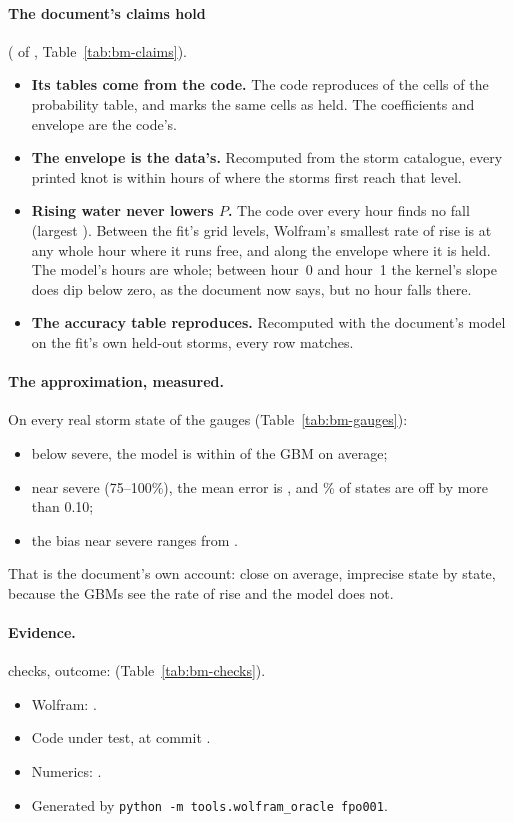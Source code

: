 \documentclass[11pt,a4paper]{article}
\begin{document}
\paragraph{The document's claims hold} (\bmClaimsMet{} of \bmClaims{},
Table~\ref{tab:bm-claims}).
\begin{itemize}[leftmargin=*,nosep]
\item \textbf{Its tables come from the code.} The code reproduces \bmGridMatched{} of the
  \bmGridCells{} cells of the probability table, and marks the same \bmHeld{} cells as
  held. The coefficients and envelope are the code's.
\item \textbf{The envelope is the data's.} Recomputed from the storm catalogue, every
  printed knot is within \bmEnvWorst{} hours of where the storms first reach that level.
\item \textbf{Rising water never lowers $P$.} The code over every hour finds no fall
  (largest \bmDrop). Between the fit's grid levels, Wolfram's smallest rate of rise is
  \bmMinFree{} at any whole hour where it runs free, and \bmMinEnv{} along the envelope
  where it is held. The model's hours are whole; between hour~0 and hour~1 the kernel's
  slope does dip below zero, as the document now says, but no hour falls there.
\item \textbf{The accuracy table reproduces.} Recomputed with the document's model on the
  fit's own held-out storms, every row matches.
\end{itemize}

\paragraph{The approximation, measured.} On every real storm state of the \bmGauges{}
gauges (Table~\ref{tab:bm-gauges}):
\begin{itemize}[leftmargin=*,nosep]
\item below severe, the model is within \bmBelowMae{} of the GBM on average;
\item near severe (75--100\%), the mean error is \bmNearMae, and \bmNearOver\% of states
  are off by more than 0.10;
\item the bias near severe ranges from \bmNearBias.
\end{itemize}
That is the document's own account: close on average, imprecise state by state, because
the GBMs see the rate of rise and the model does not.

\paragraph{Evidence.} \bmChecks{} checks, outcome: \bmOutcome{}
(Table~\ref{tab:bm-checks}).
\begin{itemize}[leftmargin=*,nosep]
\item Wolfram: \bmWolfram{}\bmWolframVia.
\item Code under test, at commit \bmCodeCommit{}\bmCodeDirty.
\item Numerics: \bmNumerics.
\item Generated \bmGenerated{} by \texttt{python -m tools.wolfram\_oracle fpo001}.
\end{itemize}
\end{document}
